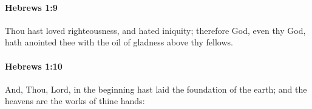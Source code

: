 		\paragraph{Hebrews 1:9} %
			\label{HEBREWS-1-9}

			Thou hast loved righteousness, and hated iniquity; therefore God, even thy God, hath anointed thee with the oil of gladness above thy fellows.

			\begin{framed}
			\scriptsize
				\begin{compactdesc}
					\item[SBLG] 
				\end{compactdesc}
			\end{framed}

		\paragraph{Hebrews 1:10} %
			\label{HEBREWS-1-10}

			And, Thou, Lord, in the beginning hast laid the foundation of the earth; and the heavens are the works of thine hands:

